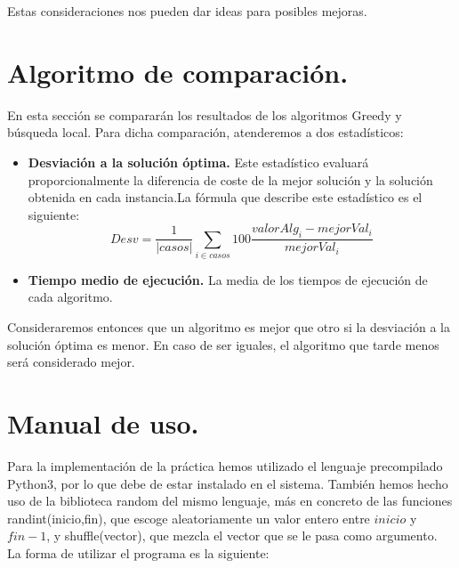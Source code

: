 Estas consideraciones nos pueden dar ideas para posibles mejoras.

\newpage

\section{Algoritmo de comparación.}
En esta sección se compararán los resultados de los algoritmos Greedy y búsqueda local. Para dicha comparación, atenderemos a dos estadísticos:\\

\begin{itemize}
	\item \textbf{Desviación a la solución óptima.} Este estadístico evaluará proporcionalmente la diferencia de coste de la mejor solución y la solución obtenida en cada instancia.La fórmula que describe este estadístico es el siguiente:
	\[Desv = \dfrac{1}{ \left| casos\right|}\sum_{i \in casos}100\dfrac{valorAlg_i - mejorVal_i}{mejorVal_i} \]
	
	\item \textbf{Tiempo medio de ejecución.} La media de los tiempos de ejecución de cada algoritmo.
\end{itemize}

Consideraremos entonces que un algoritmo es mejor que otro si la desviación a la solución óptima es menor. En caso de ser iguales, el algoritmo que tarde menos será considerado mejor.

\newpage

\section{Manual de uso.}

Para la implementación de la práctica hemos utilizado el lenguaje precompilado Python3, por lo que debe de estar instalado en el sistema. También hemos hecho uso de la biblioteca random del mismo lenguaje, más en concreto de las funciones randint(inicio,fin), que escoge aleatoriamente un valor entero entre  $inicio$ y $fin-1$, y shuffle(vector), que mezcla el vector que se le pasa como argumento.\\

La forma de utilizar el programa es la siguiente:\\

